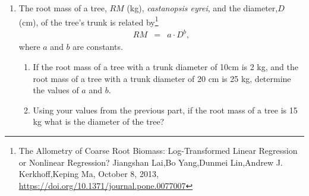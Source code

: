 \begin{enumerate}
\item The root mass of a tree, $RM$ (kg), \textit{castanopsis eyrei},
  and the diameter,$D$ (cm), of the tree's trunk is related
  by\footnote{The Allometry of Coarse Root Biomass: Log-Transformed
    Linear Regression or Nonlinear Regression?  Jiangshan Lai,Bo
    Yang,Dunmei Lin,Andrew J. Kerkhoff,Keping Ma, October 8, 2013,
    \url{https://doi.org/10.1371/journal.pone.0077007}}
  \begin{eqnarray*}
    RM & = & a \cdot D^{b},
  \end{eqnarray*}
  where $a$ and $b$ are constants.
  \begin{enumerate}
  \item If the root mass of a tree with a trunk diameter of 10cm is 2
    kg, and the root mass of a tree with a trunk diameter of 20 cm is
    25 kg, determine the values of $a$ and $b$.

    \vfill

  \item Using your values from the previous part, if the root mass of
    a tree is 15 kg what is the diameter of the tree?

    \vfill
      
  \end{enumerate}

%
%


\end{enumerate}


